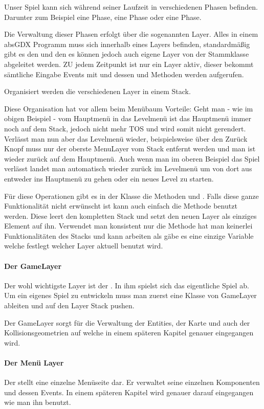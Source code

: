 Unser Spiel kann sich während seiner Laufzeit in verschiedenen Phasen befinden. Darunter zum Beispiel eine  Phase, eine  Phase oder eine  Phase.

Die Verwaltung dieser Phasen erfolgt über die sogenannten Layer. Alles in einem absGDX Programm muss sich innerhalb eines Layers befinden, standardmäßig gibt es den  und den  es können jedoch auch eigene Layer von der Stammklasse  abgeleitet werden. ZU jedem Zeitpunkt ist nur ein Layer aktiv, dieser bekommt sämtliche Eingabe Events mit und dessen  und  Methoden werden aufgerufen.

Organisiert werden die verschiedenen Layer in einem Stack.


Diese Organisation hat vor allem beim Menübaum Vorteile: Geht man - wie im obigen Beispiel - vom Hauptmenü in das Levelmenü ist das Hauptmenü immer noch auf dem Stack, jedoch nicht mehr TOS  und wird somit nicht gerendert. Verlässt man nun aber das Levelmenü wieder, beispielsweise über den Zurück Knopf muss nur der oberste MenuLayer vom Stack entfernt werden und man ist wieder zurück auf dem Hauptmenü. Auch wenn man im oberen Beispiel das Spiel verlässt landet man automatisch wieder zurück im Levelmenü um von dort aus entweder ins Hauptmenü zu gehen oder ein neues Level zu starten.

Für diese Operationen gibt es in der Klasse  die Methoden  und . Falls diese ganze Funktionalität nicht erwünscht ist kann auch einfach die Methode  benutzt werden. Diese leert den kompletten Stack und setzt den neuen Layer als einziges Element auf ihn. Verwendet man konsistent nur die Methode  hat man keinerlei Funktionalitäten des Stacks und kann arbeiten als gäbe es eine einzige Variable welche festlegt welcher Layer aktuell benutzt wird.

\paragraph{Der GameLayer}

Der wohl wichtigste Layer ist der . In ihm spielst sich das eigentliche Spiel ab. Um ein eigenes Spiel zu entwickeln muss man zuerst eine Klasse von GameLayer ableiten und auf den Layer Stack pushen.

Der GameLayer sorgt für die Verwaltung der Entities, der Karte und auch der Kollisionsgeometrien auf welche in einem späteren Kapitel genauer eingegangen wird.

\paragraph{Der Menü Layer}

Der  stellt eine einzelne Menüseite dar. Er verwaltet seine einzelnen Komponenten und dessen Events. In einem späteren Kapitel wird genauer darauf eingegangen wie man ihn benutzt.